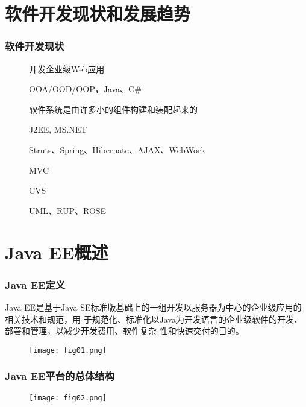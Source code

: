 \section{软件开发现状和发展趋势}
\begin{frame}[fragile] %
\frametitle{软件开发现状}

\begin{description}
\item[] 开发企业级Web应用
\item[] OOA/OOD/OOP，Java、C\#
\item[] 软件系统是由许多小的组件构建和装配起来的
\item[] J2EE, MS.NET
\item[] Struts、Spring、Hibernate、AJAX、WebWork
\item[] MVC
\item[] CVS
\item[] UML、RUP、ROSE
\end{description}
\end{frame}

\section{Java EE概述}

\begin{frame}
\frametitle{Java EE定义} 

Java EE是基于Java SE标准版基础上的一组开发以服务器为中心的企业级应用的相关技术和规范，用
于规范化、标准化以Java为开发语言的企业级软件的开发、部署和管理，以减少开发费用、软件复杂
性和快速交付的目的。

\begin{figure}
\centering
\texttt{[image: fig01.png]}
\end{figure}
\end{frame}

\begin{frame}
\frametitle{Java EE平台的总体结构} 
\begin{figure}
\centering
\texttt{[image: fig02.png]}
\end{figure}
\end{frame}


